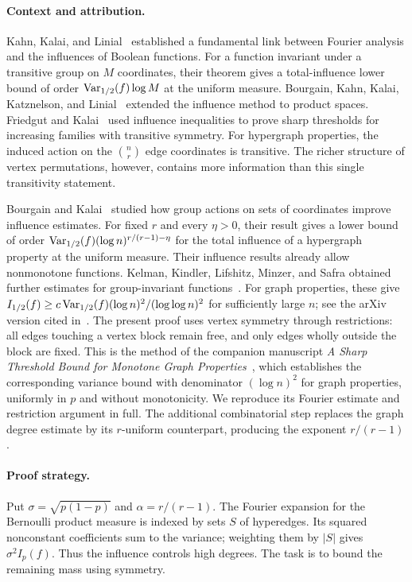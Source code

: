 \paragraph{Context and attribution.}
Kahn, Kalai, and Linial~\cite{KKL88} established a fundamental link
between Fourier analysis and the influences of Boolean functions.
For a function invariant under a transitive group on $M$ coordinates,
their theorem gives a total-influence lower bound of order
$\operatorname{Var}_{1/2}(f)\log M$ at the uniform measure.
Bourgain, Kahn, Kalai, Katznelson, and Linial~\cite{BKKKL92}
extended the influence method to product spaces.
Friedgut and Kalai~\cite{FK96} used influence inequalities to prove
sharp thresholds for increasing families with transitive symmetry.
For hypergraph properties, the induced action on the
$\binom nr$ edge coordinates is transitive. The richer structure of
vertex permutations, however, contains more information than this
single transitivity statement.

Bourgain and Kalai~\cite[Corollary~4.1]{BK97} studied how group
actions on sets of coordinates improve influence estimates.
For fixed $r$ and every $\eta>0$, their result gives a lower bound
of order $\operatorname{Var}_{1/2}(f)(\log n)^{r/(r-1)-\eta}$ for the total
influence of a hypergraph property at the uniform measure.
Their influence results already allow nonmonotone functions.
Kelman, Kindler, Lifshitz, Minzer, and Safra obtained further
estimates for group-invariant functions~\cite{KKLMS20}.
For graph properties, these give
$I_{1/2}(f)\ge c\operatorname{Var}_{1/2}(f)(\log n)^2/(\log\log n)^2$
for sufficiently large $n$; see the arXiv version cited
in~\cite[Section~7.4]{KKLMS20}.
The present proof uses vertex symmetry through restrictions: all
edges touching a vertex block remain free, and only edges wholly
outside the block are fixed. This is the method of the companion
manuscript \emph{A Sharp Threshold Bound for Monotone Graph
Properties}~\cite[Theorem~1.2 and Sections~2--3]{Graph2026}, which establishes
the corresponding variance bound with denominator $(\log n)^2$
for graph properties, uniformly in $p$ and without monotonicity.
We reproduce its Fourier estimate and restriction argument in full.
The additional combinatorial step replaces the graph degree estimate
by its $r$-uniform counterpart, producing the exponent $r/(r-1)$.

\paragraph{Proof strategy.}
Put $\sigma=\sqrt{p(1-p)}$ and $\alpha=r/(r-1)$.
The Fourier expansion for the Bernoulli product measure is indexed by
sets $S$ of hyperedges. Its squared nonconstant coefficients sum to
the variance; weighting them by $|S|$ gives $\sigma^2I_p(f)$.
Thus the influence controls high degrees. The task is to bound the
remaining mass using symmetry.

